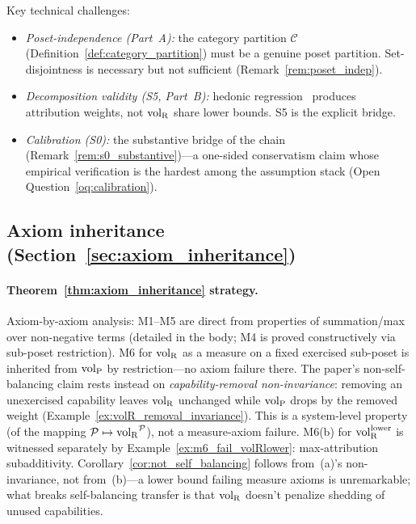 Key technical challenges:
\begin{itemize}
\item \emph{Poset-independence (Part~A):} the category
  partition $\mathcal{C}$
  (Definition~\ref{def:category_partition}) must be a genuine
  poset partition.  Set-disjointness is necessary but not
  sufficient (Remark~\ref{rem:poset_indep}).
\item \emph{Decomposition validity (S5, Part~B):} hedonic
  regression~\citep{rosen1974hedonic} produces attribution
  weights, not ${\operatorname{vol}_{\mathrm{R}}}$ share lower bounds.  S5 is the explicit
  bridge.
\item \emph{Calibration (S0):} the substantive bridge of
  the chain (Remark~\ref{rem:s0_substantive})---a one-sided
  conservatism claim whose empirical verification is the
  hardest among the assumption stack (Open
  Question~\ref{oq:calibration}).
\end{itemize}

\subsection{Axiom inheritance
(Section~\ref{sec:axiom_inheritance})}

\paragraph{Theorem~\ref{thm:axiom_inheritance} strategy.}
Axiom-by-axiom analysis:
M1--M5 are direct from properties of summation/max over
non-negative terms (detailed in the body; M4 is proved
constructively via sub-poset restriction).
M6 for ${\operatorname{vol}_{\mathrm{R}}}$ as a measure on a fixed exercised sub-poset is
inherited from ${\operatorname{vol}_{\mathrm{P}}}$ by restriction---no axiom failure
there.  The paper's non-self-balancing claim rests instead on
\emph{capability-removal non-invariance}: removing an
unexercised capability leaves ${\operatorname{vol}_{\mathrm{R}}}$ unchanged while ${\operatorname{vol}_{\mathrm{P}}}$
drops by the removed weight
(Example~\ref{ex:volR_removal_invariance}).  This is a
system-level property (of the mapping
$\mathcal{P} \mapsto {\operatorname{vol}_{\mathrm{R}}}^{\mathcal{P}}$), not a measure-axiom
failure.  M6(b) for ${\operatorname{vol}_{\mathrm{R}}^{\mathrm{lower}}}$ is witnessed separately by
Example~\ref{ex:m6_fail_volRlower}: max-attribution
subadditivity.  Corollary~\ref{cor:not_self_balancing} follows
from~(a)'s non-invariance, not from~(b)---a lower bound failing
measure axioms is unremarkable; what breaks self-balancing
transfer is that ${\operatorname{vol}_{\mathrm{R}}}$ doesn't penalize shedding of unused
capabilities.
